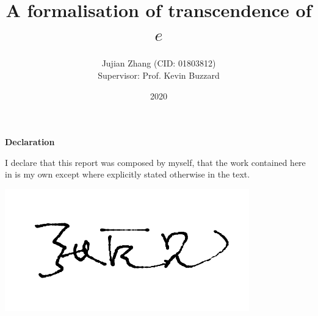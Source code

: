 \documentclass{report}
\title{A formalisation of transcendence of $e$}
\author{Jujian Zhang (CID: 01803812)\\[.5cm]{Supervisor: Prof. Kevin Buzzard}}
\date{2020}
\theoremstyle{definition}
\begin{document}
\maketitle

\clearpage\thispagestyle{empty}\addtocounter{page}{-1}
\begin{center}
  \textbf{Declaration}
\end{center}
I declare that this report was composed by myself, that the work contained here in is my own except where explicitly stated otherwise in the text.

\begin{flushright}
  \includegraphics[height=1.5\baselineskip]{signature.png}
\end{flushright}
\clearpage
\end{document}
